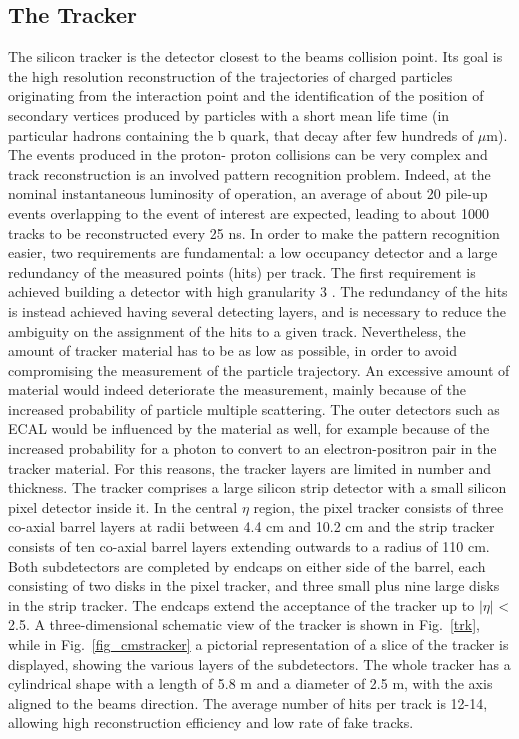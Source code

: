 \subsection*{The Tracker}
The silicon tracker is the detector closest to the beams collision point. Its goal is
the high resolution reconstruction of the trajectories of charged particles originating
from the interaction point and the identification of the position of secondary vertices
produced by particles with a short mean life time (in particular hadrons containing the
b quark, that decay after few hundreds of $\mu$m). The events produced in the proton-
proton collisions can be very complex and track reconstruction is an involved pattern
recognition problem. Indeed, at the nominal instantaneous luminosity of operation,
an average of about 20 pile-up events overlapping to the event of interest are expected,
leading to about 1000 tracks to be reconstructed every 25 ns. In order to make the
pattern recognition easier, two requirements are fundamental:
a low occupancy detector and a large redundancy of the measured points (hits) per track.
The first requirement is achieved building a detector with high granularity 3 . The
redundancy of the hits is instead achieved having several detecting layers, and is
necessary to reduce the ambiguity on the assignment of the hits to a given track.
Nevertheless, the amount of tracker material has to be as low as possible, in order to
avoid compromising the measurement of the particle trajectory. An excessive amount
of material would indeed deteriorate the measurement, mainly because of the increased
probability of particle multiple scattering. The outer detectors such as ECAL would
be influenced by the material as well, for example because of the increased probability
for a photon to convert to an electron-positron pair in the tracker material. For this
reasons, the tracker layers are limited in number and thickness. The tracker comprises
a large silicon strip detector with a small silicon pixel detector inside it. In the central
$\eta$ region, the pixel tracker consists of three co-axial barrel layers at radii between
4.4 cm and 10.2 cm and the strip tracker consists of ten co-axial barrel layers extending
outwards to a radius of 110 cm. Both subdetectors are completed by endcaps on either
side of the barrel, each consisting of two disks in the pixel tracker, and three small
plus nine large disks in the strip tracker. The endcaps extend the acceptance of the
tracker up to $|\eta|$ < 2.5. A three-dimensional schematic view of the tracker is shown in
Fig.~\ref{trk}, while in Fig.~\ref{fig_cmstracker} a pictorial representation of a slice of the tracker is displayed,
showing the various layers of the subdetectors.
The whole tracker has a cylindrical shape with a length of 5.8 m and a diameter
of 2.5 m, with the axis aligned to the beams direction. The average number of hits
per track is 12-14, allowing high reconstruction efficiency and low rate of fake tracks.

